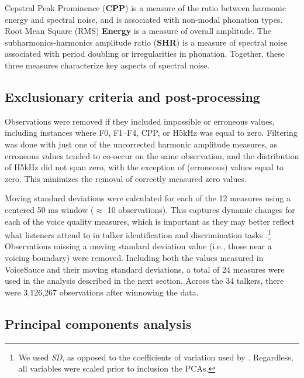 Cepstral Peak Prominence (\textbf{CPP}) is a measure of the ratio between harmonic energy and spectral noise, and is associated with non-modal phonation types. Root Mean Square (RMS) \textbf{Energy} is a measure of overall amplitude. The subharmonics-harmonics amplitude ratio (\textbf{SHR}) is a measure of spectral noise associated with period doubling or irregularities in phonation. Together, these three measures characterize key aspects of spectral noise. 

\subsection{Exclusionary criteria and post-processing}
Observations were removed if they included impossible or erroneous values, including instances where F0, F1--F4, CPP, or H5kHz was equal to zero. Filtering was done with just one of the uncorrected harmonic amplitude measures, as erroneous values tended to co-occur on the same observation, and the distribution of H5kHz did not span zero, with the exception of (erroneous) values equal to zero. This minimizes the removal of correctly measured zero values.

Moving standard deviations were calculated for each of the 12 measures using a centered 50 ms window ($\approx$ 10 observations). This captures dynamic changes for each of the voice quality measures, which is important as they may better reflect what listeners attend to in talker identification and discrimination tasks \citep{lee_2019_acoustic-paper}.\footnote{We used \textit{SD}, as opposed to the coefficients of variation used by \citet{lee_2019_acoustic-paper}. Regardless, all variables were scaled prior to inclusion the PCAs.} Observations missing a moving standard deviation value (i.e., those near a voicing boundary) were removed. Including both the values measured in VoiceSauce and their moving standard deviations, a total of 24 measures were used in the analysis described in the next section. Across the 34 talkers, there were 3,126,267 observations after winnowing the data. 

\subsection{Principal components analysis}\label{ch3:sec:pca}

